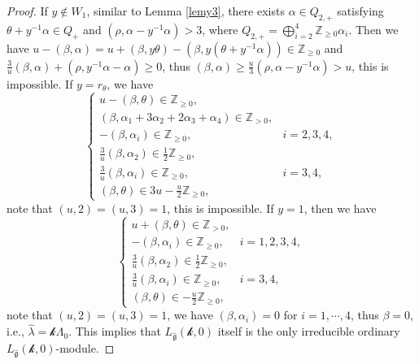 \documentclass[12pt]{article}
\begin{document}
\begin{proof}
If $y\notin W_1$, similar to Lemma \ref{lemy3}, there exists $\alpha\in Q_{2,+}$ satisfying $\theta+y^{-1}\alpha\in Q_+$ and $(\rho,\alpha-y^{-1}\alpha)>3$, where $Q_{2,+}=\bigoplus_{i=2}^{4}\mathbb{Z}_{\geq0}\alpha_i$.
Then we have $u-(\beta,\alpha)=u+(\beta,y\theta)-(\beta,y(\theta+y^{-1}\alpha))\in\mathbb{Z}_{\geq0}$ and $\frac{3}{u}(\beta,\alpha)+(\rho,y^{-1}\alpha-\alpha)\geq0$, thus $(\beta,\alpha)\geq\frac{u}{3}(\rho,\alpha-y^{-1}\alpha)>u$,
this is impossible.
If $y=r_\theta$, we have
$$\begin{cases}
u-(\beta,\theta)\in\mathbb{Z}_{\geq0},\\
 (\beta,\alpha_1+3\alpha_2+2\alpha_{3}+\alpha_4)\in\mathbb{Z}_{>0},\\
 -(\beta,\alpha_i)\in\mathbb{Z}_{\geq0},&i=2,3,4,\\
 \frac{3}{u}(\beta,\alpha_2)\in \frac{1}{2}\mathbb{Z}_{\geq0},\\
  \frac{3}{u}(\beta,\alpha_i)\in \mathbb{Z}_{\geq0},&i=3,4,\\
 (\beta,\theta)\in 3u-\frac{u}{2}\mathbb{Z}_{\geq0},
\end{cases}$$
note that $(u,2)=(u,3)=1$, this is impossible.
If $y=1$, then we have
$$\begin{cases}
u+(\beta,\theta)\in\mathbb{Z}_{>0},\\
 -(\beta,\alpha_i)\in\mathbb{Z}_{\geq0},&i=1,2,3,4,\\
 \frac{3}{u}(\beta,\alpha_2)\in \frac{1}{2}\mathbb{Z}_{\geq0},\\
  \frac{3}{u}(\beta,\alpha_i)\in \mathbb{Z}_{\geq0},&i=3,4,\\
 (\beta,\theta)\in -\frac{u}{2}\mathbb{Z}_{\geq0},
\end{cases}$$
note that $(u,2)=(u,3)=1$, we have $(\beta,\alpha_i)=0$ for $i=1,\cdots,4$, thus $\beta=0$, i.e., $\hat{\lambda}=\mathcal{k}\Lambda_0$.
This implies that $L_{\widehat{\mathfrak{g}}}(\mathcal{k},0)$ itself is the only irreducible ordinary $L_{\widehat{\mathfrak{g}}}(\mathcal{k},0)$-module.
\end{proof}
\end{document}
